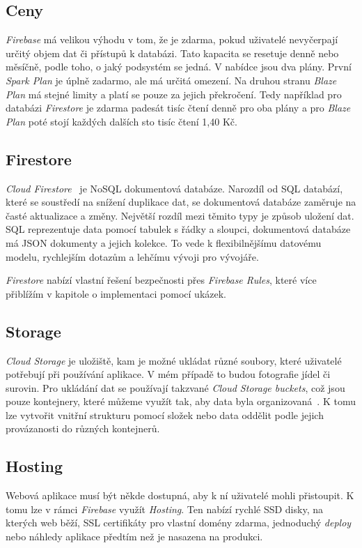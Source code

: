 \subsection{Ceny}
\emph{Firebase} má velikou výhodu v tom, že je zdarma, pokud uživatelé nevyčerpají určitý objem dat či přístupů k databázi. Tato kapacita se resetuje
denně nebo měsíčně, podle toho, o jaký podsystém se jedná. V nabídce jsou dva plány. První \emph{Spark Plan} je úplně zadarmo, ale má určitá omezení.
Na druhou stranu \emph{Blaze Plan} má stejné limity a platí se pouze za jejich překročení. Tedy například pro databázi \emph{Firestore} je zdarma padesát tisíc
čtení denně pro oba plány a pro \emph{Blaze Plan} poté stojí každých dalších sto tisíc čtení 1,40 Kč.~\cite{FirebasePricing}

\subsection{Firestore}
\emph{Cloud Firestore}~\cite{Firestore} je NoSQL dokumentová databáze. Narozdíl od SQL databází, které se soustředí na snížení duplikace dat, se dokumentová
databáze zaměruje na časté aktualizace a změny. Největší rozdíl mezi těmito typy je způsob uložení dat. SQL reprezentuje data pomocí
tabulek s řádky a sloupci, dokumentová databáze má JSON dokumenty a jejich kolekce. To vede k flexibilnějšímu datovému modelu, rychlejším
dotazům a lehčímu vývoji pro vývojáře.~\cite{MongoDBNoSQL}

\emph{Firestore} nabízí vlastní řešení bezpečnosti přes \emph{Firebase Rules}, které více přiblížím v kapitole o implementaci pomocí ukázek.

\subsection{Storage}
\emph{Cloud Storage} je uložiště, kam je možné ukládat různé soubory, které uživatelé potřebují při používání aplikace. V mém případě to
budou fotografie jídel či surovin. Pro ukládání dat se používají takzvané \emph{Cloud Storage buckets}, což jsou pouze kontejnery,
které můžeme využít tak, aby data byla organizovaná~\cite{FirebaseBucket}. K tomu lze vytvořit vnitřní strukturu pomocí složek nebo
data oddělit podle jejich provázanosti do různých kontejnerů.

\subsection{Hosting}
Webová aplikace musí být někde dostupná, aby k ní uživatelé mohli přistoupit. K tomu lze v rámci \emph{Firebase} využít \emph{Hosting}.
Ten nabízí rychlé SSD disky, na kterých web běží, SSL certifikáty pro vlastní domény zdarma, jednoduchý \emph{deploy} nebo náhledy
aplikace předtím než je nasazena na produkci.~\cite{FirebaseHosting}

